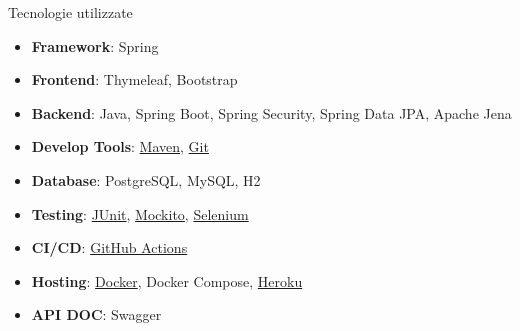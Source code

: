 \documentclass[8pt]{beamer}
\begin{document}
\begin{frame}{Tecnologie utilizzate}
    \begin{itemize}
        \item \textbf{Framework}: Spring
        \item \textbf{Frontend}: Thymeleaf, Bootstrap
        \item \textbf{Backend}: Java, Spring Boot, Spring Security, Spring Data JPA, Apache Jena
        \item \textbf{Develop Tools}: \underline{Maven}, \underline{Git}
        \item \textbf{Database}: PostgreSQL, MySQL, H2
        \item \textbf{Testing}: \underline{JUnit}, \underline{Mockito}, \underline{Selenium}
        \item \textbf{CI/CD}: \underline{GitHub Actions}
        \item \textbf{Hosting}: \underline{Docker}, Docker Compose, \underline{Heroku}
        \item \textbf{API DOC}: Swagger
    \end{itemize}
\end{frame}
\end{document}
